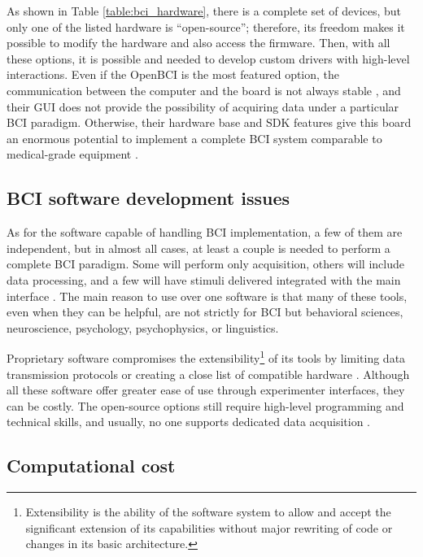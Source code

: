 As shown in Table \ref{table:bci_hardware}, there is a complete set of devices, but only one of the listed hardware is “open-source”; therefore, its freedom makes it possible to modify the hardware and also access the firmware. Then, with all these options, it is possible and needed to develop custom drivers with high-level interactions. Even if the OpenBCI is the most featured option, the communication between the computer and the board is not always stable \cite{peterson2020feasibility}, and their \gls*{GUI} does not provide the possibility of acquiring data under a particular \gls*{BCI} paradigm. Otherwise, their hardware base and \gls*{SDK} features give this board an enormous potential to implement a complete \gls*{BCI} system comparable to medical-grade equipment \cite{frey2016comparison}.

\subsection{BCI software development issues}

As for the software capable of handling \gls*{BCI} implementation, a few of them are independent, but in almost all cases, at least a couple is needed to perform a complete \gls*{BCI} paradigm. Some will perform only acquisition, others will include data processing, and a few will have stimuli delivered integrated with the main interface \cite{brunner2018bci}. The main reason to use over one software is that many of these tools, even when they can be helpful, are not strictly for \gls*{BCI} but behavioral sciences, neuroscience, psychology, psychophysics, or linguistics. 

Proprietary software compromises the extensibility\footnote{Extensibility is the ability of the software system to allow and accept the significant extension of its capabilities without major rewriting of code or changes in its basic architecture.} of its tools by limiting data transmission protocols or creating a close list of compatible hardware \cite{lecuyer2008brain, palaus2017neural, bassolino2018non}. Although all these software offer greater ease of use through experimenter interfaces, they can be costly. The open-source options still require high-level programming and technical skills, and usually, no one supports dedicated data acquisition \cite{nam2018brain}.

\subsection{Computational cost}

